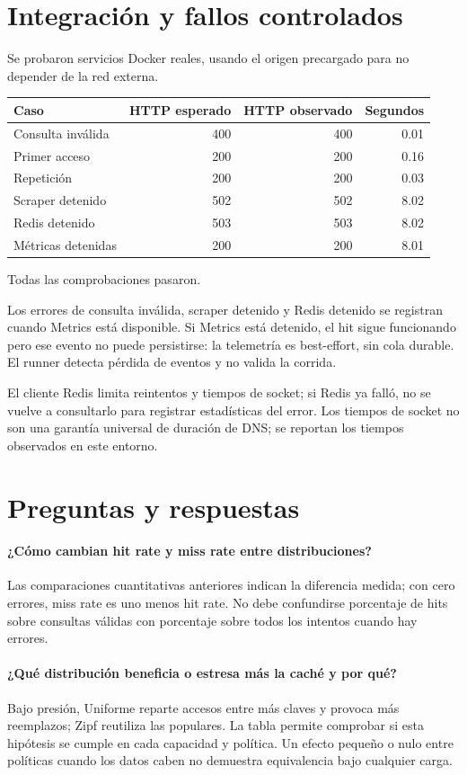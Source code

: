 \documentclass[11pt]{article}
\begin{document}
\section{Integración y fallos controlados}
Se probaron servicios Docker reales, usando el origen precargado para no depender de la red externa.\par
\begin{center}\begin{tabular}{lrrr}\toprule Caso & HTTP esperado & HTTP observado & Segundos\\\midrule
Consulta inválida & 400 & 400 & 0.01 \\
Primer acceso & 200 & 200 & 0.16 \\
Repetición & 200 & 200 & 0.03 \\
Scraper detenido & 502 & 502 & 8.02 \\
Redis detenido & 503 & 503 & 8.02 \\
Métricas detenidas & 200 & 200 & 8.01 \\
\bottomrule\end{tabular}\end{center}
Todas las comprobaciones pasaron.\par
Los errores de consulta inválida, scraper detenido y Redis detenido se registran cuando Metrics está disponible. Si Metrics está detenido, el hit sigue funcionando pero ese evento no puede persistirse: la telemetría es best-effort, sin cola durable. El runner detecta pérdida de eventos y no valida la corrida.\par
El cliente Redis limita reintentos y tiempos de socket; si Redis ya falló, no se vuelve a consultarlo para registrar estadísticas del error. Los tiempos de socket no son una garantía universal de duración de DNS; se reportan los tiempos observados en este entorno.\par
\section{Preguntas y respuestas}
\paragraph{¿Cómo cambian hit rate y miss rate entre distribuciones?} Las comparaciones cuantitativas anteriores indican la diferencia medida; con cero errores, miss rate es uno menos hit rate. No debe confundirse porcentaje de hits sobre consultas válidas con porcentaje sobre todos los intentos cuando hay errores.
\paragraph{¿Qué distribución beneficia o estresa más la caché y por qué?} Bajo presión, Uniforme reparte accesos entre más claves y provoca más reemplazos; Zipf reutiliza las populares. La tabla permite comprobar si esta hipótesis se cumple en cada capacidad y política. Un efecto pequeño o nulo entre políticas cuando los datos caben no demuestra equivalencia bajo cualquier carga.
\end{document}
